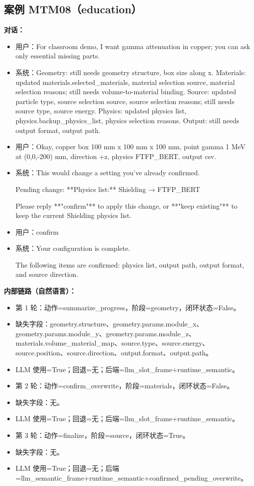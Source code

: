 \documentclass[11pt]{ctexart}
\begin{document}
\subsection{案例 MTM08（education）}
\textbf{对话：}
\begin{itemize}
\item 用户：For classroom demo, I want gamma attenuation in copper; you can ask only essential missing parts.
\item 系统：Geometry: still needs geometry structure, box size along x. Materials: updated materials.selected\_materials, material selection source, material selection reasons; still needs volume-to-material binding. Source: updated particle type, source selection source, source selection reasons; still needs source type, source energy. Physics: updated physics list, physics.backup\_physics\_list, physics selection reasons. Output: still needs output format, output path.
\item 用户：Okay, copper box 100 mm x 100 mm x 100 mm, point gamma 1 MeV at (0,0,-200) mm, direction +z, physics FTFP\_BERT, output csv.
\item 系统：This would change a setting you've already confirmed.

Pending change:  
**Physics list:** Shielding → FTFP\_BERT

Please reply **"confirm"** to apply this change, or **"keep existing"** to keep the current Shielding physics list.
\item 用户：confirm
\item 系统：Your configuration is complete.

The following items are confirmed: physics list, output path, output format, and source direction.
\end{itemize}
\textbf{内部链路（自然语言）：}
\begin{itemize}
\item 第 1 轮：动作=summarize\_progress，阶段=geometry，闭环状态=False。
\item 缺失字段：geometry.structure、geometry.params.module\_x、geometry.params.module\_y、geometry.params.module\_z、materials.volume\_material\_map、source.type、source.energy、source.position、source.direction、output.format、output.path。
\item LLM 使用=True；回退=无；后端=llm\_slot\_frame+runtime\_semantic。
\item 第 2 轮：动作=confirm\_overwrite，阶段=materials，闭环状态=False。
\item 缺失字段：无。
\item LLM 使用=True；回退=无；后端=llm\_slot\_frame+runtime\_semantic。
\item 第 3 轮：动作=finalize，阶段=source，闭环状态=True。
\item 缺失字段：无。
\item LLM 使用=True；回退=无；后端=llm\_semantic\_frame+runtime\_semantic+confirmed\_pending\_overwrite。
\end{itemize}
\end{document}
